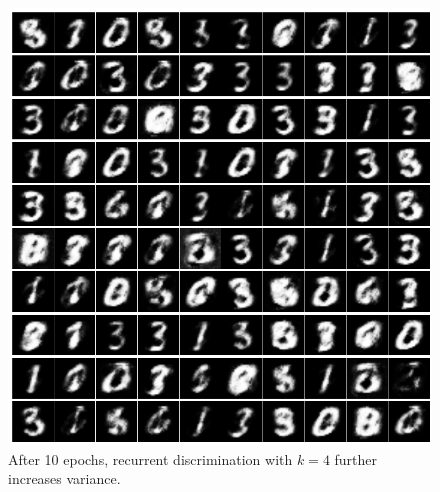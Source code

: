 \documentclass{article}
\begin{document}
\begin{figure}[h]
\caption{After 10 epochs, recurrent discrimination with $k=4$ further increases variance.}
\label{fig:rd4}
\includegraphics[scale=0.3]{images/minibatch4.png}
\centering
\end{figure}





\end{document}

